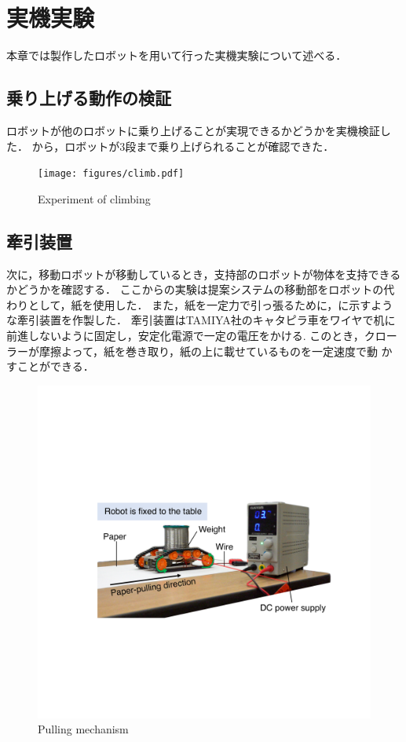 \section{実機実験}
本章では製作したロボットを用いて行った実機実験について述べる．

\subsection{乗り上げる動作の検証}
ロボットが他のロボットに乗り上げることが実現できるかどうかを実機検証した．
から，ロボットが3段まで乗り上げられることが確認できた．
\begin{figure}[tb]
  \centering
  \texttt{[image: figures/climb.pdf]}
  \caption{Experiment of climbing}
  \label{fig:climb}
\end{figure}

\subsection*{牽引装置}
次に，移動ロボットが移動しているとき，支持部のロボットが物体を支持できるかどうかを確認する．
ここからの実験は提案システムの移動部をロボットの代わりとして，紙を使用した．
また，紙を一定力で引っ張るために，に示すような牽引装置を作製した．
牽引装置はTAMIYA社のキャタピラ車をワイヤで机に前進しないように固定し，安定化電源で一定の電圧をかける. このとき，クローラーが摩擦よって，紙を巻き取り，紙の上に載せているものを一定速度で動 かすことができる．
\begin{figure}[tb]
  \centering
  \includegraphics[width=0.9\columnwidth]{figures/pulling-mechanism.pdf}
  \caption{Pulling mechanism}
  \label{fig:pulling-mechanism}
\end{figure}

